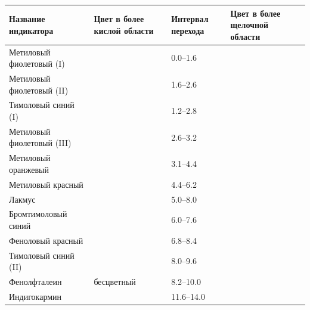 \begin{table}[htbp]
    \small
    \begin{tabularx}{\textwidth}{
        >{\hsize}Y
        >{\hsize}Z
        >{\hsize}Z
        >{\hsize}Z
        }
        \hline
        Название индикатора & Цвет в более кислой области & Интервал перехода & Цвет в более щелочной области \\
        \hline
        Метиловый фиолетовый (I) &  & \num{0,0}--\num{1,6} &  \\
        \hline
        Метиловый фиолетовый (II) &  & \num{1,6}--\num{2,6} &  \\
        \hline
        Тимоловый синий (I) &  & \num{1,2}--\num{2,8} &  \\
        \hline
        Метиловый фиолетовый (III) &  & \num{2,6}--\num{3,2} &  \\
        \hline
        Метиловый оранжевый &  & \num{3,1}--\num{4,4} &  \\
        \hline
        Метиловый красный &  & \num{4,4}--\num{6,2} &  \\
        \hline
        Лакмус &  & \num{5,0}--\num{8,0} &  \\
        \hline
        Бромтимоловый синий &  & \num{6,0}--\num{7,6} &  \\
        \hline
        Феноловый красный &  & \num{6,8}--\num{8,4} &  \\
        \hline
        Тимоловый синий (II) &  & \num{8,0}--\num{9,6} &  \\
        \hline
        Фенолфталеин & бесцветный & \num{8,2}--\num{10,0} &  \\
        \hline
        Индигокармин &  & \num{11,6}--\num{14,0} &  \\
        \hline
    \end{tabularx}
\end{table}

